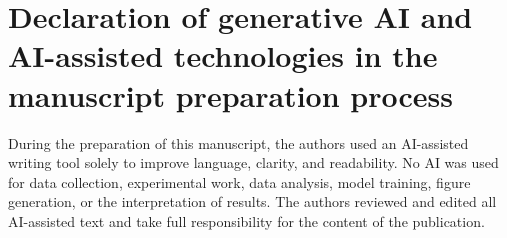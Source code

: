 \documentclass[preprint,11pt]{elsarticle}
\begin{document}
\section*{Declaration of generative AI and AI-assisted technologies in the
manuscript preparation process}

During the preparation of this manuscript, the authors used an AI-assisted
writing tool solely to improve language, clarity, and readability. No AI was
used for data collection, experimental work, data analysis, model training,
figure generation, or the interpretation of results. The authors reviewed and
edited all AI-assisted text and take full responsibility for the content of the
publication.

\begingroup
\footnotesize


\endgroup
\end{document}
